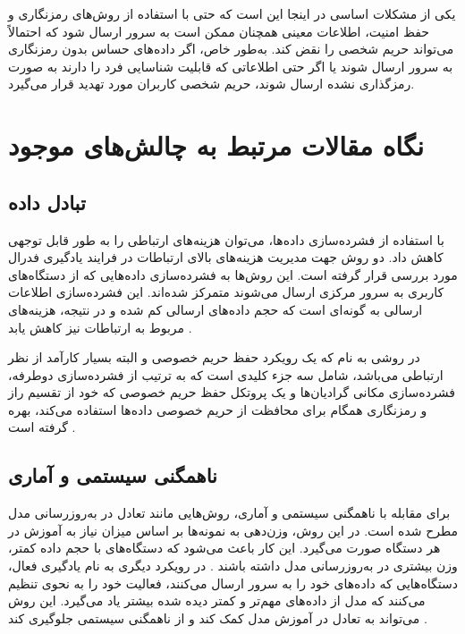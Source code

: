 یکی از مشکلات اساسی در اینجا این است که حتی با استفاده از روش‌های رمزنگاری و حفظ امنیت، اطلاعات معینی همچنان ممکن است به سرور ارسال شود که احتمالاً می‌تواند حریم شخصی را نقض کند. به‌طور خاص، اگر داده‌های حساس بدون رمزنگاری به سرور ارسال شوند یا اگر حتی اطلاعاتی که قابلیت شناسایی فرد را دارند به صورت رمزگذاری نشده ارسال شوند، حریم شخصی کاربران مورد تهدید قرار می‌گیرد.


\section{نگاه مقالات مرتبط به چالش‌های موجود}

\subsection{تبادل داده}
با استفاده از فشرده‌سازی داده‌ها، می‌توان هزینه‌های ارتباطی را به طور قابل توجهی کاهش داد. دو روش جهت مدیریت هزینه‌های بالای ارتباطات در فرایند یادگیری فدرال مورد بررسی قرار گرفته است. این روش‌ها به فشرده‌سازی داده‌هایی که از دستگاه‌های کاربری به سرور مرکزی ارسال می‌شوند متمرکز شده‌اند. این فشرده‌سازی اطلاعات ارسالی به گونه‌ای است که حجم داده‌های ارسالی کم شده و در نتیجه، هزینه‌های مربوط به ارتباطات نیز کاهش یابد
\cite{konevcny2016federated}.

در روشی به نام
%
که یک رویکرد حفظ حریم خصوصی و البته بسیار کارآمد از نظر ارتباطی می‌باشد، شامل سه جزء کلیدی است که به ترتیب از فشرده‌سازی دوطرفه، فشرده‌سازی مکانی گرادیان‌ها و یک پروتکل حفظ حریم خصوصی که خود از تقسیم راز%
 و رمزنگاری همگام%
  برای محافظت از حریم خصوصی داده‌ها استفاده می‌کند، بهره گرفته است
  \cite{fang2021privacy}.


\subsection{ناهمگنی سیستمی و آماری}
برای مقابله با ناهمگنی سیستمی و آماری، روش‌هایی مانند تعادل در به‌روزرسانی مدل مطرح شده است. در این روش، وزن‌دهی به نمونه‌ها بر اساس میزان نیاز به آموزش در هر دستگاه صورت می‌گیرد. این کار باعث می‌شود که دستگاه‌های با حجم داده کمتر، وزن بیشتری در به‌روزرسانی مدل داشته باشند
\cite{konevcny2015federated}.
در رویکرد دیگری به نام یادگیری فعال، دستگاه‌هایی که داده‌های خود را به سرور ارسال می‌کنند، فعالیت خود را به نحوی تنظیم می‌کنند که مدل از داده‌های مهم‌تر و کمتر دیده شده بیشتر یاد می‌گیرد. این روش می‌تواند به تعادل در آموزش مدل کمک کند و از ناهمگنی سیستمی جلوگیری کند
\cite{konevcny2016federated}.

